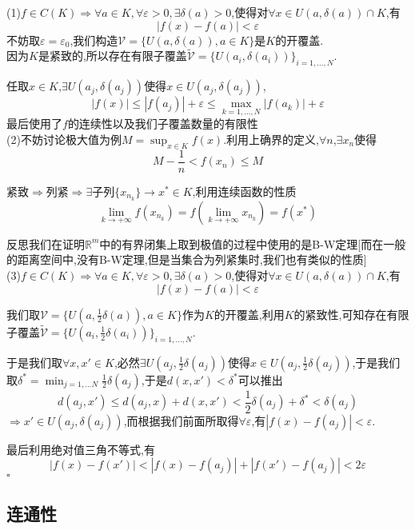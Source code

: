 \documentclass[11pt,hyperref,a4paper,UTF8]{ctexart}
\newenvironment{cproof}{%
\heiti{证明}\kaishu
}{%
  \hfill $\square$
  \par\bigskip
}
\newcommand{\RR}{\mathbb{R}}
\begin{document}
\begin{CJK}{UTF8}{gkai}
\begin{cproof}
  (1)$f\in C(K) \Rightarrow \forall a \in K,\forall \varepsilon > 0,\exists \delta(a) > 0$,使得对$\forall x \in U(a,\delta(a)) \cap K$,有
  \[|f(x) - f(a)| < \varepsilon\]
  不妨取$\varepsilon = \varepsilon_0$,我们构造$\mathcal{V} = \{U(a,\delta(a)),a\in K\}$是$K$的开覆盖.\\

  因为$K$是紧致的,所以存在有限子覆盖$\tilde{\mathcal{V}} = \{U(a_i,\delta(a_i))\}_{i = 1,\ldots, N}$.

  任取$x \in K$,$\exists U(a_j,\delta(a_j))$使得$x \in U(a_j,\delta(a_j))$,
  \[|f(x)| \leq |f(a_j)| + \varepsilon \leq \max_{k = 1,\ldots,N} |f(a_k)| + \varepsilon\]
  最后使用了$f$的连续性以及我们子覆盖数量的有限性\\

  (2)不妨讨论极大值为例$M = \sup_{x\in K}f(x)$.利用上确界的定义,$\forall n$,$\exists x_n$使得
  \[M - \frac{1}{n} < f(x_n) \leq M\]

  紧致$\Rightarrow$列紧$\Rightarrow \exists$子列$\{x_{n_k}\} \to x^\ast \in K$,利用连续函数的性质
  \[\lim_{k \to +\infty}f(x_{n_k}) = f(\lim_{k \to +\infty} x_{n_k}) = f(x^\ast)\]

  反思我们在证明$\RR^m$中的有界闭集上取到极值的过程中使用的是B-W定理[而在一般的距离空间中,没有B-W定理,但是当集合为列紧集时,我们也有类似的性质]\\

  (3)$f\in C(K) \Rightarrow \forall a \in K,\forall \varepsilon > 0,\exists \delta(a) > 0$,使得对$\forall x \in U(a,\delta(a)) \cap K$,有
  \[|f(x) - f(a)| < \varepsilon\]

  我们取$\mathcal{V} = \{U(a,\frac{1}{2}\delta(a)),a\in K\}$作为$K$的开覆盖,利用$K$的紧致性,可知存在有限子覆盖$\tilde{\mathcal{V}} = \{U(a_i,\frac{1}{2}\delta(a_i))\}_{i = 1,\ldots,N}$.

  于是我们取$\forall x,x' \in K$,必然$\exists U(a_j,\frac{1}{2}\delta(a_j))$使得$x \in U(a_j,\frac{1}{2}\delta(a_j))$,于是我们取$\delta^\ast = \min_{j = 1,\ldots N} \frac{1}{2} \delta(a_j)$,于是$d(x,x') < \delta^\ast$可以推出
  \[d(a_j,x') \leq d(a_j,x) + d(x,x') < \frac{1}{2}\delta(a_j) + \delta^\ast < \delta(a_j)\]
  $\Rightarrow x' \in U(a_j,\delta(a_j))$,而根据我们前面所取得$\forall \varepsilon$,有$|f(x) - f(a_j)| < \varepsilon$.
  
  最后利用绝对值三角不等式,有
  \[|f(x) - f(x')| < |f(x) - f(a_j)| + |f(x') - f(a_j)| < 2\varepsilon\]
\end{cproof}

\subsection{连通性}


\end{CJK}
\end{document}
